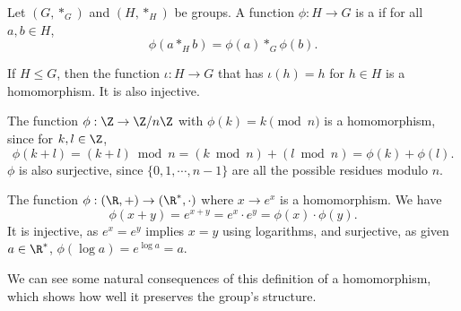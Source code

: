 \documentclass[a4]{scrreprt}
\begin{document}
\begin{definition}[Homomorphism]
	Let $(G, *_G)$ and $(H, *_H)$ be groups. A function $\phi : H \rightarrow G$ is a  if for all $a, b \in H$,
	$$
	\phi(a *_H b) = \phi(a) *_G \phi(b).
	$$
\end{definition}

\begin{example}
	If $H \leq G$, then the function $\iota : H \rightarrow G$ that has $\iota(h) = h$ for $h \in H$ is a homomorphism. It is also injective.
\end{example}

\begin{example}
	The function $\phi : \Z\rightarrow \Z/n\Z$ with $\phi(k) = k \pmod{n}$ is a homomorphism, since for $k, l \in \Z$,
	$$
\phi(k + l) = (k + l) \bmod{n} = (k \bmod{n}) + (l \bmod{n}) = \phi(k) + \phi(l).
	$$
	$\phi$ is also surjective, since $\{0, 1, \cdots, n - 1\}$ are all the possible residues modulo $n$.
\end{example}

\begin{example}
	The function $\phi : (\R, + )\rightarrow (\R^*, \cdot)$ where $x \rightarrow e^x$ is a homomorphism. We have
	$$
	\phi(x + y) = e^{x + y} = e^x \cdot e^y = \phi(x) \cdot \phi(y).
	$$
	It is injective, as $e^x = e^y$ implies $x = y$ using logarithms, and surjective, as given $a \in \R^*$, $\phi(\log a) = e^{\log a} = a$.
\end{example}

We can see some natural consequences of this definition of a homomorphism, which shows how well it preserves the group's structure.
\end{document}

